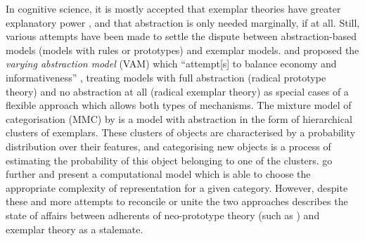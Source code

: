 In cognitive science, it is mostly accepted that exemplar theories have greater explanatory power \citep[184]{Vanpaemel2016}, and that abstraction is only needed marginally, if at all.
Still, various attempts have been made to settle the dispute between abstraction-based models (models with rules or prototypes) and exemplar models.
\cite{VanpaemelStorms2008} and \citet{LeeVanpaemel2008} proposed the \textit{varying abstraction model} (VAM) which ``attempt[s] to balance economy and informativeness'' \citep[745]{LeeVanpaemel2008}, treating models with full abstraction (radical prototype theory) and no abstraction at all (radical exemplar theory) as special cases of a flexible approach which allows both types of mechanisms.
The mixture model of categorisation (MMC) by \cite{Rosseel2002} is a model with abstraction in the form of hierarchical clusters of exemplars.
These clusters of objects are characterised by a probability distribution over their features, and categorising new objects is a process of estimating the probability of this object belonging to one of the clusters.
\cite{GriffithsEa2009} go further and present a computational model which is able to choose the appropriate complexity of representation for a given category.
However, despite these and more attempts to reconcile or unite the two approaches \citet[183--184]{Vanpaemel2016} describes the state of affairs between adherents of neo-prototype theory (such as \citealp{MindaSmith2001,MindaSmith2002}) and exemplar theory as a stalemate.


